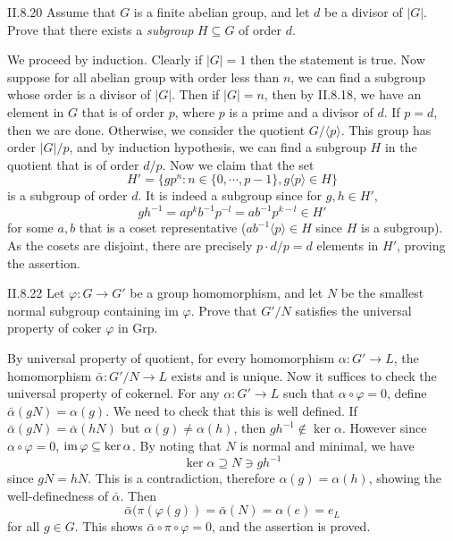 \begin{problem}{II.8.20}
Assume that $G$ is a finite abelian group, and let $d$ be a divisor of $|G|$. Prove that there exists a \textit{subgroup} $H \subseteq G$ of order $d$.
\end{problem}
\begin{pf}
We proceed by induction. Clearly if $|G| = 1$ then the statement is true. Now suppose for all abelian group with order less than $n$, we can find a subgroup whose order is a divisor of $|G|$. Then if $|G| = n$, then by II.8.18, we have an element in $G$ that is of order $p$, where $p$ is a prime and a divisor of $d$. If $p = d$, then we are done. Otherwise, we consider the quotient $G/\langle p \rangle$. This group has order $|G|/p$, and by induction hypothesis, we can find a subgroup $H$ in the quotient that is of order $d/p$. Now we claim that the set
\[
H' = \{ gp^n : n \in \{0, \cdots, p-1\}, g\langle p \rangle \in H \}
\]
is a subgroup of order $d$. It is indeed a subgroup since for $g, h \in H'$,
\[
gh^{-1} = ap^kb^{-1}p^{-l} = ab^{-1}p^{k-l} \in H'
\]
for some $a, b$ that is a coset representative ($ab^{-1}\langle p \rangle \in H$ since $H$ is a subgroup). As the cosets are disjoint, there are precisely $p \cdot d/p = d$ elements in $H'$, proving the assertion.
\end{pf}

\begin{problem}{II.8.22}
Let $\varphi:G \to G'$ be a group homomorphism, and let $N$ be the smallest normal subgroup containing im $\varphi$. Prove that $G'/N$ satisfies the universal property of $\text{coker }\varphi$ in \textsf{Grp}.
\end{problem}
\begin{pf}
By universal property of quotient, for every homomorphism $\alpha : G' \to L$,  the homomorphism $\bar{\alpha} : G'/N \to L$ exists and is unique. Now it suffices to check the universal property of cokernel. For any $\alpha : G' \to L$ such that $\alpha \circ \varphi = 0$, define $\bar{\alpha}(gN) = \alpha(g)$. We need to check that this is well defined. If $\bar{\alpha}(gN) = \bar{\alpha}(hN)$ but $\alpha(g) \neq \alpha(h)$, then $gh^{-1} \notin \ker \alpha$. However since $\alpha \circ \varphi = 0$, $\operatorname{im} \varphi \subseteq \ker \alpha$. By noting that $N$ is normal and minimal, we have \[
\ker \alpha \supseteq N \ni gh^{-1}
\]
since $gN = hN$. This is a contradiction, therefore $\alpha(g) = \alpha(h)$, showing the well-definedness of $\bar{\alpha}$. Then
\[
\bar{\alpha}(\pi(\varphi(g)) = \bar{\alpha}(N) = \alpha(e) = e_L
\]
for all $g \in G$. This shows $\bar{\alpha} \circ \pi \circ \varphi = 0$, and the assertion is proved.
\end{pf}

